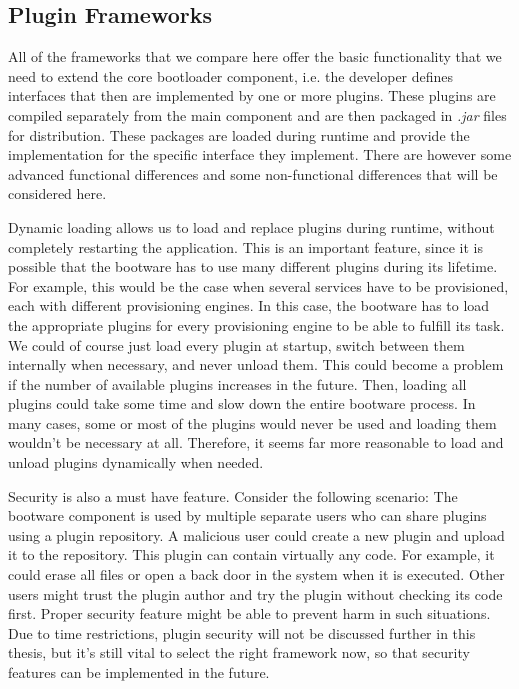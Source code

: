 \subsection{Plugin Frameworks}
\label{implementation:selecting:pluginframeworks}

All of the frameworks that we compare here offer the basic functionality that we need to extend the core bootloader component, i.e. the developer defines interfaces that then are implemented by one or more plugins.
These plugins are compiled separately from the main component and are then packaged in \textit{.jar} files for distribution.
These packages are loaded during runtime and provide the implementation for the specific interface they implement.
There are however some advanced functional differences and some non-functional differences that will be considered here.

Dynamic loading allows us to load and replace plugins during runtime, without completely restarting the application.
This is an important feature, since it is possible that the bootware has to use many different plugins during its lifetime.
For example, this would be the case when several services have to be provisioned, each with different provisioning engines.
In this case, the bootware has to load the appropriate plugins for every provisioning engine to be able to fulfill its task.
We could of course just load every plugin at startup, switch between them internally when necessary, and never unload them.
This could become a problem if the number of available plugins increases in the future.
Then, loading all plugins could take some time and slow down the entire bootware process.
In many cases, some or most of the plugins would never be used and loading them wouldn't be necessary at all.
Therefore, it seems far more reasonable to load and unload plugins dynamically when needed.

Security is also a must have feature.
Consider the following scenario: The bootware component is used by multiple separate users who can share plugins using a plugin repository.
A malicious user could create a new plugin and upload it to the repository.
This plugin can contain virtually any code.
For example, it could erase all files or open a back door in the system when it is executed.
Other users might trust the plugin author and try the plugin without checking its code first.
Proper security feature might be able to prevent harm in such situations.
Due to time restrictions, plugin security will not be discussed further in this thesis, but it's still vital to select the right framework now, so that security features can be implemented in the future.

